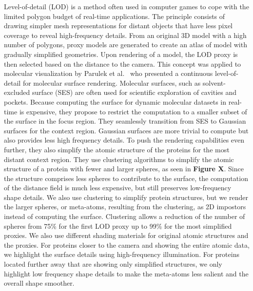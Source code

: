 Level-of-detail (LOD) is a method often used in computer games to cope with the limited polygon budget of real-time applications.
The principle consists of drawing simpler mesh representations for distant objects that have less pixel coverage to reveal high-frequency details. 
From an original 3D model with a high number of polygons, proxy models are generated to create an atlas of model with gradually simplified geometries.
Upon rendering of a model, the LOD proxy is then selected based on the distance to the camera.
This concept was applied to molecular visualization by Parulek et al.~\cite{parulek2014continuous} who presented a continuous level-of-detail for molecular surface rendering.
Molecular surfaces, such as solvent-excluded surface (SES) are often used for scientific exploration of cavities and pockets.
Because computing the surface for dynamic molecular datasets in real-time is expensive, they propose to restrict the computation to a smaller subset of the surface in the focus region.
They seamlessly transition from SES to Gaussian surfaces for the context region.
Gaussian surfaces are more trivial to compute but also provides less high frequency details.
To push the rendering capabilities even further, they also simplify the atomic structure of the proteins for the most distant context region.
They use clustering algorithms to simplify the atomic structure of a protein with fewer and larger spheres, as seen in \textbf{Figure X}.
Since the structure comprises less spheres to contribute to the surface, the computation of the distance field is much less expensive, but still preserves low-frequency shape details.
We also use clustering to simplify protein structures, but we render the larger spheres, or meta-atoms, resulting from the clustering, as 2D impostors instead of computing the surface.
Clustering allows a reduction of the number of spheres from 75\% for the first LOD proxy up to 99\% for the most simplified proxies.
We also use different shading materials for original atomic structures and the proxies.
For proteins closer to the camera and showing the entire atomic data, we highlight the surface details using high-frequency illumination.
For proteins located further away that are showing only simplified structures, we only highlight low frequency shape details to make the meta-atoms less salient and the overall shape smoother.

